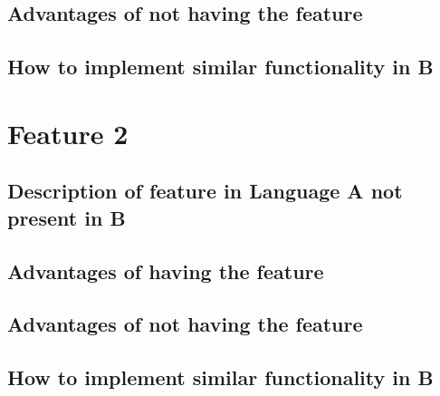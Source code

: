 \documentclass{article}
\begin{document}
\subsection*{Advantages of not having the feature}
\subsection*{How to implement similar functionality in B}

\section*{Feature 2}
\subsection*{Description of feature in Language A not present in B}
\subsection*{Advantages of having the feature}
\subsection*{Advantages of not having the feature}
\subsection*{How to implement similar functionality in B}
\end{document}
